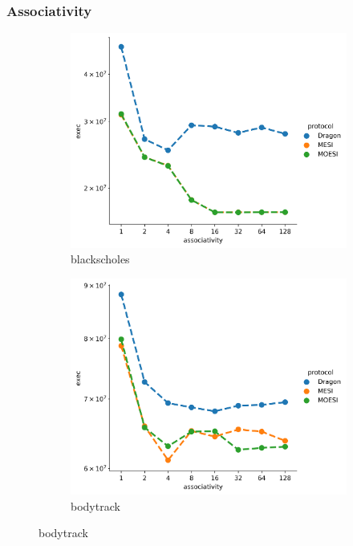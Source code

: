 \documentclass[nonacm,acmsmall,screen,11pt]{acmart}
\begin{document}
\subsubsection{Associativity}
\label{subsub:associativity}
\begin{figure}[htb!]
  \centering
  \begin{subfigure}{0.32\textwidth}
    \includegraphics[width=\textwidth]{associativity-blackscholes}
    \caption{blackscholes}
  \end{subfigure}
  \begin{subfigure}{0.32\textwidth}
    \includegraphics[width=\columnwidth]{associativity-bodytrack}
    \caption{bodytrack}

\end{subfigure}
\end{figure}
\end{document}
